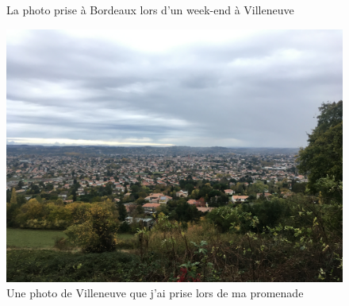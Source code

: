 \documentclass[a4paper,12pt]{article}
\begin{document}
\begin{figure}[htbp]
\begin{minipage}{0.3\textwidth}
		\caption{La photo prise à Bordeaux lors d'un week-end à Villeneuve}
		\label{fig:image2}
	\end{minipage}
	\hfill
	\begin{minipage}{0.3\textwidth}
		\centering
		\includegraphics[width=\linewidth]{123}
		\caption{Une photo de Villeneuve que j'ai prise lors de ma promenade}
		\label{fig:image3}
	\end{minipage}
	\label{fig:myfigure}
\end{figure}
\end{document}
